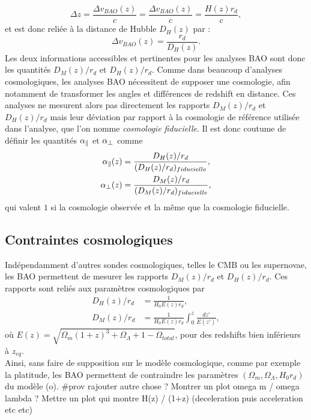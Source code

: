 \documentclass[11pt, twoside, a4paper, openright]{report}
\begin{document}
\begin{equation}
  \label{eq:v_bao}
\Delta z = \frac{\Delta v_{BAO}(z)}{c} =   \frac{\Delta v_{BAO}(z)}{c} = \frac{H(z) r_d}{c} ,
\end{equation}
et est donc reliée à la distance de Hubble $D_H(z)$ par :
\begin{equation}
  \label{eq:v_bao2}
  \Delta v_{BAO}(z) = \frac{r_d }{D_H(z)}.
\end{equation}
Les deux informations accessibles et pertinentes pour les analyses BAO sont donc les quantités $D_M(z) / r_d$ et $D_H(z) / r_d$. Comme dans beaucoup d'analyses cosmologiques, les analyses BAO nécessitent de supposer une cosmologie, afin notamment de transformer les angles et différences de redshift en distance. Ces analyses ne mesurent alors pas directement les rapports  $D_M(z) / r_d$ et $D_H(z) / r_d$ mais leur déviation par rapport à la cosmologie de référence utilisée dans l'analyse, que l'on nomme \emph{cosmologie fiducielle}. Il est donc coutume de définir les quantités $\alpha_{\parallel}{}$ et $\alpha_{\perp}{}$ comme
\begin{align}
  \label{eq:apar}
  \alpha_{\parallel}{}(z) &= \frac{D_H(z) / r_d}{(D_H(z) / r_d)_{fiducielle}} , \\
  \label{eq:aperp}
  \alpha_{\perp}{}(z) &= \frac{D_M(z) / r_d}{(D_M(z) / r_d)_{fiducielle}} ,
\end{align}
qui valent $1$ si la cosmologie observée et la même que la cosmologie fiducielle.


\subsection{Contraintes cosmologiques}
Indépendamment d'autres sondes cosmologiques, telles le CMB ou les supernovae, les BAO permettent de mesurer les rapports $D_M(z) / r_d$ et $D_H(z) / r_d$. Ces rapports sont reliés aux paramètres cosmologiques par
\begin{align}
  D_H(z) / r_d &= \frac{1}{H_0 E(z) r_d}, \\
  D_M(z) / r_d &= \frac{1}{H_0 E(z) r_d} \int_0^z \frac{dz'}{E(z')},
\end{align}
où $E(z) = \sqrt{\Omega_m (1+z)^3 + \Omega_{\Lambda} + 1 - \Omega_{total}}$, pour des redshifts bien inférieurs à $z_{eq}$. \\
Ainsi, sans faire de supposition sur le modèle cosmologique, comme par exemple la platitude, les BAO permettent de contraindre les paramètres $(\Omega_{m} , \Omega_{\Lambda} , H_0 r_d)$ du modèle (o)\lcdm{}.
\#prov rajouter autre chose ? Montrer un plot omega m / omega lambda ?
Mettre un plot qui montre H(z) / (1+z) (deceleration puis acceleration etc etc)
\end{document}
